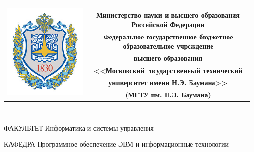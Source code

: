 \documentclass[a4paper,14pt]{article}
\begin{document}
\pgfplotsset{compat=1.17}

\begin{titlepage}

    \begin{table}
        \centering
        \footnotesize
        \begin{tabular}{cc}
            \multirow{8}{*}{\includegraphics[scale=0.35]{bmstu.jpg}}
            & \\
            & \\
            & \textbf{Министерство науки и высшего образования Российской Федерации} \\
            & \textbf{Федеральное государственное бюджетное образовательное учреждение} \\
            & \textbf{высшего образования} \\
            & \textbf{<<Московский государственный технический} \\
            & \textbf{университет имени Н.Э. Баумана>>} \\
            & \textbf{(МГТУ им. Н.Э. Баумана)} \\
        \end{tabular}
    \end{table}

    \vspace{-2.5cm}

    \begin{flushleft}
        \rule[-1cm]{\textwidth}{3pt}
        \rule{\textwidth}{1pt}
    \end{flushleft}

    \begin{flushleft}
		ФАКУЛЬТЕТ Информатика и системы управления 
	\end{flushleft}
        КАФЕДРА Программное обеспечение ЭВМ и информационные технологии


\end{titlepage}
\end{document}
